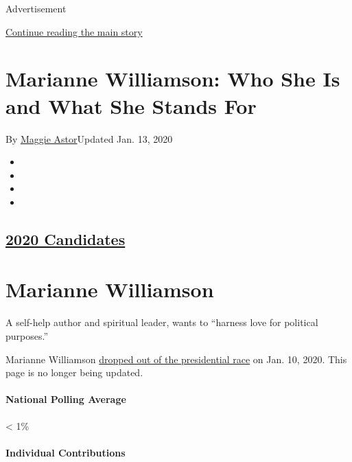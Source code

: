 Advertisement

\protect\hyperlink{after-top}{Continue reading the main story}

\hypertarget{marianne-williamson-who-she-is-and-what-she-stands-for}{%
\section{Marianne Williamson: Who She Is and What She Stands
For}\label{marianne-williamson-who-she-is-and-what-she-stands-for}}

By \href{https://www.nytimes.com/by/maggie-astor}{Maggie Astor}Updated
Jan. 13, 2020

\begin{itemize}
\item
\item
\item
\item
\end{itemize}

\hypertarget{2020-candidates}{%
\subsection{\texorpdfstring{\href{https://www.nytimes.com/interactive/2019/us/politics/2020-presidential-candidates.html}{2020
Candidates}}{2020 Candidates}}\label{2020-candidates}}

\hypertarget{marianne-williamson}{%
\section{Marianne Williamson}\label{marianne-williamson}}

A self-help author and spiritual leader, wants to ``harness love for
political purposes.''

Marianne Williamson
\href{https://www.nytimes.com/2020/01/10/us/politics/marianne-williamson-dropping-out.html}{dropped
out of the presidential race} on Jan. 10, 2020. This page is no longer
being updated.

\hypertarget{national-polling-average}{%
\paragraph{National Polling Average}\label{national-polling-average}}

\textless{} 1\%

\hypertarget{individual-contributions}{%
\paragraph{Individual Contributions}\label{individual-contributions}}

